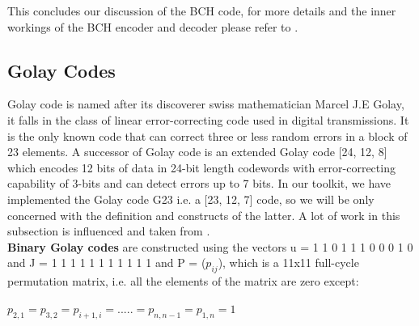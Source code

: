 This concludes our discussion of the BCH code, for more details and the inner workings of the BCH encoder and decoder please refer to \cite{66}.

\subsection{Golay Codes}
\label{golay_related}
Golay code is named after its discoverer swiss mathematician Marcel J.E Golay, it falls in the class of linear error-correcting code used in digital transmissions. It is the only known code that can correct three or less random errors in a block of 23 elements. A successor of Golay code is an extended Golay code [24, 12, 8] which encodes 12 bits of data in 24-bit length codewords with error-correcting capability of 3-bits and can detect errors up to 7 bits. In our toolkit, we have implemented
the Golay code G23 i.e. a [23, 12, 7] code, so we will be only concerned with the definition and constructs of the latter. A lot of work in this subsection is influenced and taken from \cite{golay}.\\

\textbf{Binary Golay codes} are constructed using the vectors u = 1 1 0 1 1 1 0 0 0 1 0 and J = 1 1 1 1 1 1 1 1 1 1 1 and P = ($p_{ij}$), which is a 11x11 full-cycle permutation matrix, i.e. all the elements of the matrix are zero except:

\tab \tab \tab $p_{2,1} = p_{3,2} = p_{i+1,i} = . . . . . = p_{n,n-1} = p_{1,n} = 1$

